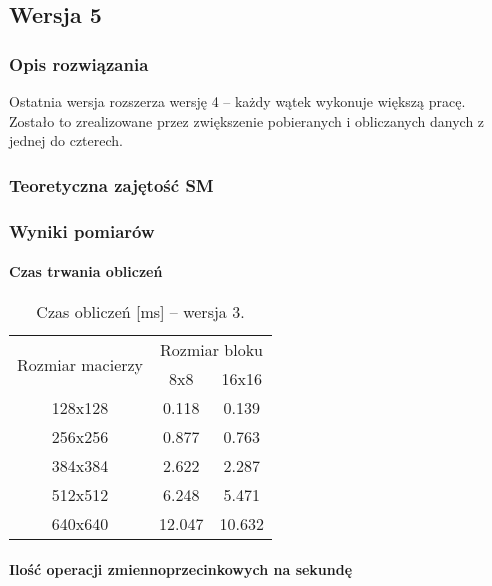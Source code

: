 
\subsection{Wersja 5}

\subsubsection{Opis rozwiązania}

Ostatnia wersja rozszerza wersję 4 -- każdy wątek wykonuje większą pracę. Zostało to zrealizowane przez zwiększenie pobieranych i obliczanych danych z jednej do czterech.



\subsubsection{Teoretyczna zajętość SM}

\subsubsection{Wyniki pomiarów}

\paragraph{Czas trwania obliczeń}

\begin{table}[H]
\centering
\begin{tabular}{|c|c|c|}
\hline
\multirow{2}{*}{Rozmiar macierzy} & \multicolumn{2}{c|}{Rozmiar bloku} \\ \cline{2-3}
& 8x8 & 16x16 \\ \hline
128x128 & 0.118 & 0.139 \\ \hline
256x256 & 0.877 & 0.763 \\ \hline
384x384 & 2.622 & 2.287 \\ \hline
512x512 & 6.248 & 5.471 \\ \hline
640x640 & 12.047 & 10.632 \\ \hline
\end{tabular}
\caption{Czas obliczeń [ms] -- wersja 3.}
\end{table}

\paragraph{Ilość operacji zmiennoprzecinkowych na sekundę}

